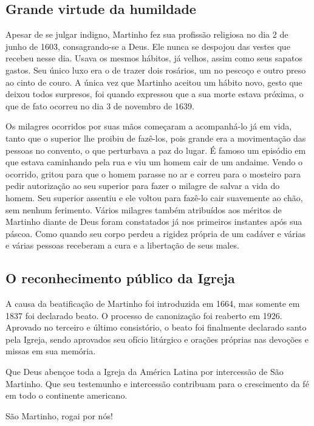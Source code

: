 \documentclass[a4paper,14pt]{extarticle} \usepackage[utf8]{inputenc}
\begin{document}
\subsection{Grande virtude da humildade}

Apesar de se julgar indigno, Martinho fez sua profissão religiosa no dia 2 de junho de 1603, consagrando-se a Deus. Ele nunca se despojou das vestes que recebeu nesse dia. Usava os mesmos hábitos, já velhos, assim como seus sapatos gastos. Seu único luxo era o de trazer dois rosários, um no pescoço e outro preso ao cinto de couro. A única vez que Martinho aceitou um hábito novo, gesto que deixou todos surpresos, foi quando expressou que a sua morte estava próxima, o que de fato ocorreu no dia 3 de novembro de 1639.

Os milagres ocorridos por suas mãos começaram a acompanhá-lo já em vida, tanto que o superior lhe proibiu de fazê-los, pois grande era a movimentação das pessoas no convento, o que perturbava a paz do lugar. É famoso um episódio em que estava caminhando pela rua e viu um homem cair de um andaime. Vendo o ocorrido, gritou para que o homem parasse no ar e correu para o mosteiro para pedir autorização ao seu superior para fazer o milagre de salvar a vida do homem. Seu superior assentiu e ele voltou para fazê-lo cair suavemente ao chão, sem nenhum ferimento. Vários milagres também atribuídos aos méritos de Martinho diante de Deus foram constatados já nos primeiros instantes após sua páscoa. Como quando seu corpo perdeu a rigidez própria de um cadáver e várias e várias pessoas receberam a cura e a libertação de seus males.

\subsection{O reconhecimento público da Igreja}

A causa da beatificação de Martinho foi introduzida em 1664, mas somente em 1837 foi declarado beato. O processo de canonização foi reaberto em 1926. Aprovado no terceiro e último consistório, o beato foi finalmente declarado santo pela Igreja, sendo aprovados seu ofício litúrgico e orações próprias nas devoções e missas em sua memória. 

Que Deus abençoe toda a Igreja da América Latina por intercessão de São Martinho. Que seu testemunho e intercessão contribuam para o crescimento da fé em todo o continente americano. 

São Martinho, rogai por nós!  
\end{document}
